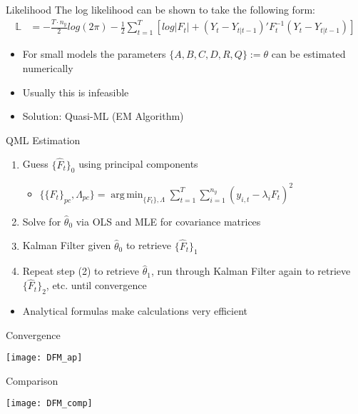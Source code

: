 \documentclass{beamer}
\DeclareMathOperator*{\argmin}{arg\,min}
\begin{document}
\begin{frame}{Likelihood}
The log likelihood can be shown to take the following form:
\begin{align*}
\mathbb{L} &= -\frac{T \cdot n_{y}}{2}log(2\pi) - \frac{1}{2} \sum_{t=1}^T\left[ log|F_t| + (Y_t - Y_{t|t-1})'F_{t}^{-1}(Y_t - Y_{t|t-1})\right]
\end{align*}
\begin{itemize}
\item For small models the parameters $\{A,B,C,D,R,Q\}:=\theta$ can be estimated numerically
\item Usually this is infeasible
\item Solution: Quasi-ML (EM Algorithm)
\end{itemize}
\end{frame}

\begin{frame}{QML Estimation}
\begin{enumerate}
\item Guess $\{\hat{F}_t\}_0$ using principal components
\begin{itemize}
\item $\{\{F_t\}_{pc},\Lambda_{pc}\} = \argmin_{\{F_t\},\Lambda} \sum_{t=1}^{T}\sum_{i=1}^{n_y} (y_{i,t} - \lambda_{i}F_{t})^2$
\end{itemize}
\item Solve for $\hat{\theta}_{0}$ via OLS and MLE for covariance matrices
\item Kalman Filter given $\hat{\theta}_{0}$ to retrieve $\{ \hat{F}_t\}_1$
\item Repeat step (2) to retrieve $\hat{\theta}_{1}$, run through Kalman Filter again to retrieve $\{ \hat{F}_t\}_{2}$, etc. until convergence
\end{enumerate}
\begin{itemize}
\item Analytical formulas make calculations very efficient
\end{itemize}
\end{frame}

\begin{frame}{Convergence} %
\begin{center}
 \texttt{[image: DFM\_ap]}
\end{center}
\end{frame}

\begin{frame}{Comparison} %
\begin{center}
 \texttt{[image: DFM\_comp]}
\end{center}
\end{frame}
\end{document}
